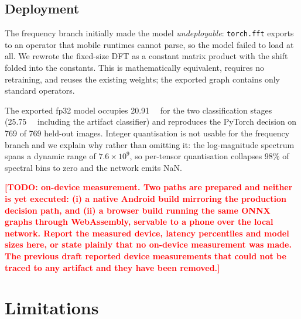 \documentclass[conference]{IEEEtran}
\newcommand{\TODO}[1]{\textcolor{red}{\textbf{[TODO: #1]}}}
\begin{document}
\subsection{Deployment}
\label{sec:deploy}
The frequency branch initially made the model \emph{undeployable}: \texttt{torch.fft} exports
to an operator that mobile runtimes cannot parse, so the model failed to load at all. We
rewrote the fixed-size DFT as a constant matrix product with the shift folded into the
constants. This is mathematically equivalent, requires no retraining, and reuses the existing
weights; the exported graph contains only standard operators.

The exported fp32 model occupies \SI{20.91}{\mega\byte} for the two classification stages
(\SI{25.75}{\mega\byte} including the artifact classifier) and reproduces the PyTorch
decision on 769 of 769 held-out images. Integer quantisation is not usable for the frequency
branch and we explain why rather than omitting it: the log-magnitude spectrum spans a
dynamic range of $7.6\times10^{9}$, so per-tensor quantisation collapses 98\% of spectral
bins to zero and the network emits NaN.

\TODO{on-device measurement. Two paths are prepared and neither is yet executed:
(i) a native Android build mirroring the production decision path, and (ii) a browser
build running the same ONNX graphs through WebAssembly, servable to a phone over the local
network. Report the measured device, latency percentiles and model sizes here, or state
plainly that no on-device measurement was made. The previous draft reported device
measurements that could not be traced to any artifact and they have been removed.}

\section{Limitations}
\label{sec:limits}
\end{document}
